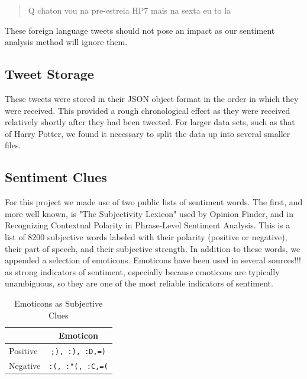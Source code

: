 \documentclass[11pt]{article}
\begin{document}
\begin{quote}
Q chaton vou na pre-estreia HP7 mais na sexta eu to la 
\end{quote}

These foreign language tweets should not pose an impact as our sentiment analysis method will ignore them.
\subsection{Tweet Storage}
These tweets were stored in their JSON object format in the order in which they were received. This provided a rough chronological effect as they were received relatively shortly after they had been tweeted. For larger data sets, such as that of Harry Potter, we found it necessary to split the data up into several smaller files.
\subsection{Sentiment Clues}
For this project we made use of two public lists of sentiment words. The first, and more well known, is "The Subjectivity Lexicon" used by Opinion Finder, and in Recognizing Contextual Polarity in Phrase-Level Sentiment Analysis. This is a list of 8200 subjective words labeled with their polarity (positive or negative), their part of speech, and their subjective strength. In addition to these words, we appended a selection of emoticons. Emoticons have been used in several sources!!! as strong indicators of sentiment, especially because emoticons are typically unambiguous, so they are one of the most reliable indicators of sentiment.

\begin{table}[ht!]
\centering
\caption{Emoticons as Subjective Clues}
\begin{tabular}{|l|c|}
\hline
 & Emoticon \\
\hline
Positive & \tt{;)}, \tt{:)}, \tt{:D},\tt{=)}\\
\hline
Negative & \tt{:(}, \tt{:"(}, \tt{:C},\tt{=(}\\
\hline
\end{tabular}
\end{table}
\end{document}
